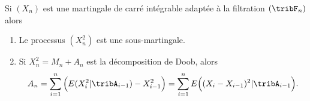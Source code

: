 \begin{lemma}   \label{LemPVgeKfc}
    Si \( (X_n)\) est une martingale de carré intégrable adaptée à la filtration \( (\tribF_n)\) alors
    \begin{enumerate}
        \item
            Le processus \( (X_n^2)\) est une sous-martingale.
        \item
            Si \( X_n^2=M_n+A_n\) est la décomposition de Doob, alors
            \begin{equation}    \label{EqSTGxVWP}
                A_n=\sum_{i=1}^n\Big( E(X_i^2|\tribA_{i-1})-X_{i-1}^2 \Big)=\sum_{i=1}^nE\Big( (X_i-X_{i-1})^2|\tribA_{i-1} \Big).
            \end{equation}
    \end{enumerate}
\end{lemma}

